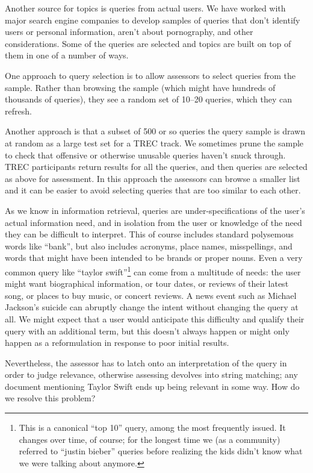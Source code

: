 \documentclass[nobib]{tufte-book}
\begin{document}
Another source for topics is queries from actual users.  We have worked with major search engine companies to develop samples of queries that don't identify users or personal information, aren't about pornography, and other considerations.  Some of the queries are selected and topics are built on top of them in one of a number of ways.

One approach to query selection is to allow assessors to select queries from the sample.  Rather than browsing the sample (which might have hundreds of thousands of queries), they see a random set of 10--20 queries, which they can refresh.

Another approach is that a subset of 500 or so queries the query sample is drawn at random as a large test set for a TREC track.  We sometimes prune the sample to check that offensive or otherwise unusable queries haven't snuck through.  TREC participants return results for all the queries, and then queries are selected as above for assessment.  In this approach the assessors can browse a smaller list and it can be easier to avoid selecting queries that are too similar to each other.

As we know in information retrieval, queries are under-specifications of the user's actual information need, and in isolation from the user or knowledge of the need they can be difficult to interpret.  This of course includes standard polysemous words like ``bank'', but also includes acronyms, place names, misspellings, and words that might have been intended to be brands or proper nouns.  Even a very common query like ``taylor swift''\footnote{This is a canonical ``top 10'' query, among the most frequently issued.  It changes over time, of course; for the longest time we (as a community) referred to ``justin bieber'' queries before realizing the kids didn't know what we were talking about anymore.} can come from a multitude of needs: the user might want biographical information, or tour dates, or reviews of their latest song, or places to buy music, or concert reviews.  A news event such as Michael Jackson's suicide can abruptly change the intent without changing the query at all.  We might expect that a user would anticipate this difficulty and qualify their query with an additional term, but this doesn't always happen or might only happen as a reformulation in response to poor initial results.

Nevertheless, the assessor has to latch onto an interpretation of the query in order to judge relevance, otherwise assessing devolves into string matching; any document mentioning Taylor Swift ends up being relevant in some way.  How do we resolve this problem?
\end{document}
